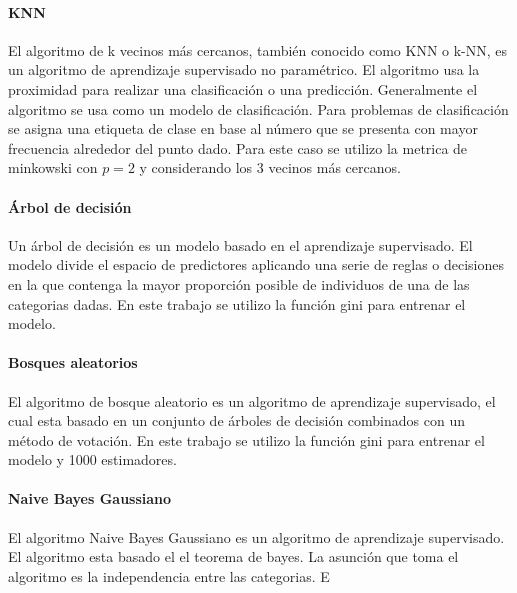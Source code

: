 \paragraph{KNN}

El algoritmo de k vecinos más cercanos, también conocido como KNN o k-NN, es un algoritmo de aprendizaje supervisado no paramétrico. El algoritmo usa la proximidad para realizar una clasificación o una predicción. Generalmente el algoritmo se usa como un modelo de clasificación. Para problemas de clasificación se asigna una etiqueta de clase en base al número que se presenta con mayor frecuencia alrededor del punto dado. Para este caso se utilizo la metrica de minkowski con $p=2$ y considerando los 3 vecinos más cercanos.

\paragraph{Árbol de decisión}

Un árbol de decisión es un modelo basado en el aprendizaje supervisado. El modelo divide el espacio de predictores aplicando una serie de reglas o decisiones en la que contenga la mayor proporción posible de individuos de una de las categorias dadas. En este trabajo se utilizo la función gini para entrenar el modelo.

\paragraph{Bosques aleatorios}

El algoritmo de bosque aleatorio es un algoritmo de aprendizaje supervisado, el cual esta basado en un conjunto de árboles de decisión combinados con un método de votación. En este trabajo se utilizo la función gini para entrenar el modelo y 1000 estimadores.

\paragraph{Naive Bayes Gaussiano}

El algoritmo Naive Bayes Gaussiano es un algoritmo de aprendizaje supervisado. El algoritmo esta basado el el teorema de bayes. La asunción que toma el algoritmo es la independencia entre las categorias. E

